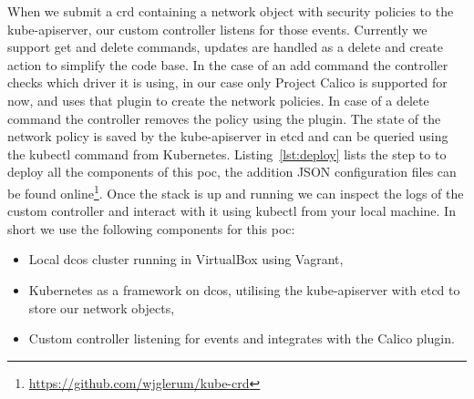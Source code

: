 When we submit a \gls{crd} containing a network object with security policies to the kube-apiserver, our custom controller listens for those events. Currently we support get and delete commands, updates are handled as a delete and create action to simplify the code base. In the case of an add command the controller checks which driver it is using, in our case only Project Calico is supported for now, and uses that plugin to create the network policies. In case of a delete command the controller removes the policy using the plugin. The state of the network policy is saved by the kube-apiserver in etcd and can be queried using the kubectl command from Kubernetes. Listing~\ref{lst:deploy} lists the step to to deploy all the components of this \gls{poc}, the addition JSON configuration files can be found online\footnote{\url{https://github.com/wjglerum/kube-crd}}. Once the stack is up and running we can inspect the logs of the custom controller and interact with it using kubectl from your local machine. In short we use the following components for this \gls{poc}:
\begin{itemize}
    \item Local \gls{dcos} cluster running in VirtualBox\cite{virtualbox} using Vagrant\cite{vagrant},
    \item Kubernetes as a framework on \gls{dcos}, utilising the kube-apiserver with etcd to store our network objects,
    \item Custom controller listening for events and integrates with the Calico plugin.
\end{itemize}


